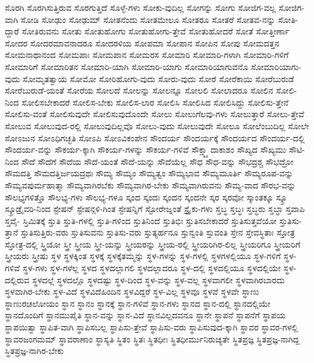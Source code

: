 {ಸೊರಗಿ
ಸೊರಗಿಸುತ್ತಿರುವ
ಸೊರಗುತ್ತಿದೆ
ಸೊಳ್ಳೆ-ಗಳು
ಸೋಕು-ವುದಿಲ್ಲ
ಸೋಗನ್ನು
ಸೋಗು
ಸೋಜಿಗ-ವಲ್ಲ
ಸೋಜಿಗ-ವಾಗಿ
ಸೋಡಿ
ಸೋಢುಂ
ಸೋಢುಮ್
ಸೋತನೆಂದು
ಸೋತಮೇಲೂ
ಸೋತರೂ
ಸೋತರೆ
ಸೋತವ-ನನ್ನು
ಸೋತಿ-ದ್ದಾರೆ
ಸೋತಿರುವನು
ಸೋತು
ಸೋತುಹೋಗು
ಸೋತುಹೋಗು-ತ್ತೇವೆ
ಸೋತುಹೋದರೆ
ಸೋತೆ
ಸೋತ್ತೀರ್ಣಾ
ಸೋದರ
ಸೋದರಮಾವನಾದರೂ
ಸೋದರಳಿಯ
ಸೋಪಮಾ
ಸೋಪಾನ
ಸೋಪಿನ
ಸೋಪು
ಸೋಮದತ್ತನ
ಸೋಮನಾಥಾನಂದ
ಸೋಮಪಾಃ
ಸೋಮಪಾನ
ಸೋಮರಸ
ಸೋಮಾರಿ
ಸೋಮಾರಿ-ಗಳಾಗಿ
ಸೋಮಾರಿ-ಗಳಿಗೆ
ಸೋಮಾರಿಗೆ
ಸೋಮಾರಿತನ
ಸೋಮಾರಿ-ಯಾಗಿ
ಸೋಮಾರಿ-ಯಾಗು
ಸೋಮಾರಿಯಾಗುವನೊ
ಸೋಮಾರಿಯಾಗು-ವುದು
ಸೋಮೃತತ್ವಾಯ
ಸೋಮೋ
ಸೋರಿಹೋಗು-ವುದು
ಸೋರು-ವುದು
ಸೋರೆ
ಸೋರೆಕಾಯಿ
ಸೋರೆಬುರುಡೆ
ಸೋರೆಬುರುಡೆ-ಯಂತೆ
ಸೋರೆಯ
ಸೋಲದೆ
ಸೋಲನ್ನು
ಸೋಲನ್ನೂ
ಸೋಲಲಿ
ಸೋಲಾದರೂ
ಸೋಲಿನ
ಸೋಲಿ-ನಿಂದ
ಸೋಲಿಸಬೇಕಾದರೆ
ಸೋಲಿಸ-ಬೇಕು
ಸೋಲಿಸ-ಲಾರ
ಸೋಲಿಸಿ
ಸೋಲಿಸಿದ
ಸೋಲಿಸಿದ್ದು
ಸೋಲಿಸು-ತ್ತೇನೆ
ಸೋಲಿಸು-ವಂತೆ
ಸೋಲಿಸುವುದೇ
ಸೋಲಿಸುವುದೊಂದೇ
ಸೋಲು
ಸೋಲುಗೆಲವು-ಗಳು
ಸೋಲುತ್ತಾರೆ
ಸೋಲು-ತ್ತೇವೆ
ಸೋಲುವ
ಸೋಲುವುದ-ರಲ್ಲಿ
ಸೋಲುವುದಿಲ್ಲವೊ
ಸೋಲು-ವುದು
ಸೋಲುವುದೇ
ಸೋಲೂ
ಸೋಲೆಂಬುದಿಲ್ಲ
ಸೋಲೇ
ಸೋಽಜುನ
ಸೋಽಧಿಗಚ್ಛತಿ
ಸೋಽಪಿ
ಸೋಽವಿಕಂಪೇನ
ಸೌಂದರ್ಯ
ಸೌಂದರ್ಯಕ್ಕೆ
ಸೌಂದರ್ಯದ
ಸೌಂದರ್ಯ-ದಲ್ಲಿ
ಸೌಂದರ್ಯ-ವನ್ನು
ಸೌಕರ್ಯ-ಕ್ಕಾಗಿ
ಸೌಕರ್ಯ-ಗಳನ್ನು
ಸೌಕರ್ಯ-ಗಳಿವೆ
ಸೌಕ್ಷ್ಮ್ಯಾದಾಕಾಶಂ
ಸೌಖ್ಯದ
ಸೌಖ್ಯಮು
ಸೌಟಿ-ನಿಂದ
ಸೌದೆ
ಸೌದೆಗೆ
ಸೌದೆಯ
ಸೌದೆ-ಯಂತೆ
ಸೌದೆ-ಯನ್ನು
ಸೌದೆಯೆಲ್ಲ
ಸೌಧ
ಸೌಧ-ವನ್ನು
ಸೌಭದ್ರಶ್ಚ
ಸೌಭದ್ರೋ
ಸೌಮದತ್ತಿ
ಸೌಮದತ್ತಿರ್ಜಯದ್ರಥಃ
ಸೌಮ್ಯ
ಸೌಮ್ಯಂ
ಸೌಮ್ಯತ್ವಂ
ಸೌಮ್ಯಭಾವ
ಸೌಮ್ಯಮೂರ್ತಿ
ಸೌಮ್ಯರೂಪ-ವನ್ನು
ಸೌಮ್ಯವಪುರ್ಮಹಾತ್ಮಾ
ಸೌಮ್ಯವಾಗಿರಬೆಕು
ಸೌಮ್ಯವಾಗಿರ-ಬೇಕು
ಸೌಮ್ಯವಾಗಿರುವನು
ಸೌಮ್ಯ-ವಾದ
ಸೌರಭ-ವನ್ನು
ಸೌಲಭ್ಯಗಳಿತ್ತೊ
ಸೌಲಭ್ಯ-ಗಳು
ಸೌಲಭ್ಯ-ಗಳೂ
ಸ್ಕಂದ
ಸ್ಕಂದಃ
ಸ್ಕಂದನ
ಸ್ಕಂದನೇ
ಸ್ಕರ
ಸ್ಕರವೋ
ಸ್ಕಾಂತಕ್ಕೂ
ಸ್ಕ್ರೂ
ಸ್ಕ್ರೂಡ್ರೈವರಿ-ನಿಂದ
ಸ್ಟೇಷನ್
ಸ್ಟೇಷನ್ಗಳಿ-ಗಿಂತ
ಸ್ಟೇಷನ್ನಿಗೆ
ಸ್ಟೋರೇಜ್ನಂತೆ
ಸ್ಟ್ರೈಕು-ಗಳು
ಸ್ತಬ್ಧ
ಸ್ತಬ್ಧಃ
ಸ್ತಬ್ಧರು
ಸ್ತಬ್ಧಾ
ಸ್ತವಾಪಿ
ಸ್ತವೈ-
ಸ್ತಿಮಿತಕ್ಕೆ
ಸ್ತುತಿ
ಸ್ತುತಿ-ಗಳಲ್ಲಿ
ಸ್ತುತಿ-ಗಳಿಂದ
ಸ್ತುತಿನಿಂದೆ
ಸ್ತುತಿಭಿಃ
ಸ್ತುತಿಸಬೇಕಾದರೆ
ಸ್ತುತಿಸುತ್ತವೆಯೋ
ಸ್ತುತಿಸು-ತ್ತಾನೆ
ಸ್ತುತಿಸುತ್ತಿರು-ವರು
ಸ್ತುತಿಸುವನು
ಸ್ತುತಿಸು-ವರು
ಸ್ತುತ್ಯರ್ಹನೂ
ಸ್ತುನ್ವಂತಿ
ಸ್ತುವಂತಿ
ಸ್ತೇನ
ಸ್ತೇವಸ್ಥಿತಾಃ
ಸ್ತೋತ್ರ
ಸ್ತೋತ್ರ-ದಲ್ಲಿ
ಸ್ತ್ರಿಯೋ
ಸ್ತ್ರೀ
ಸ್ತ್ರೀಯ
ಸ್ತ್ರೀ-ಯನ್ನು
ಸ್ತ್ರೀಯರನ್ನು
ಸ್ತ್ರೀಯ-ರಲ್ಲಿ
ಸ್ತ್ರೀಯರಿಗಿರ-ಲಿಲ್ಲ
ಸ್ತ್ರೀಯರಿಗೂ
ಸ್ತ್ರೀಯರಿಗೆ
ಸ್ತ್ರೀಯರು
ಸ್ತ್ರೀಷು
ಸ್ಥಳ
ಸ್ಥಳಕ್ಕಿಂತ
ಸ್ಥಳಕ್ಕೆ
ಸ್ಥಳಕ್ಕೆತಮ್ಮನ್ನು
ಸ್ಥಳ-ಗಳನ್ನು
ಸ್ಥಳ-ಗಳಲ್ಲಿ
ಸ್ಥಳಗಳಲ್ಲಿಯೂ
ಸ್ಥಳ-ಗಳಿಗೆ
ಸ್ಥಳ-ಗಳಿವೆ
ಸ್ಥಳ-ಗಳು
ಸ್ಥಳ-ಗಳೆಲ್ಲ
ಸ್ಥಳದ
ಸ್ಥಳದಲ್ಲಾಗಲಿ
ಸ್ಥಳದಲ್ಲಾದರೂ
ಸ್ಥಳ-ದಲ್ಲಿ
ಸ್ಥಳದಲ್ಲಿಯೂ
ಸ್ಥಳದಲ್ಲಿಯೇ
ಸ್ಥಳ-ದಲ್ಲಿರುವ
ಸ್ಥಳದಲ್ಲೆ
ಸ್ಥಳದಲ್ಲೊ
ಸ್ಥಳದಷ್ಟು
ಸ್ಥಳ-ದಿಂದ
ಸ್ಥಳ-ವನ್ನು
ಸ್ಥಳ-ವಲ್ಲ
ಸ್ಥಳವಾಗಲೀ
ಸ್ಥಳವಾಗಿರಬಾರದು
ಸ್ಥಳವಾಗಿರ-ಬೇಕು
ಸ್ಥಳ-ವಿದೆ
ಸ್ಥಳವಿದೆಹಿಂದಿನ
ಸ್ಥಳವಿದ್ದರೆ
ಸ್ಥಳ-ವಿಲ್ಲ
ಸ್ಥಳವೂ
ಸ್ಥಳವೆ
ಸ್ಥಳವೇ
ಸ್ಥಾಣು
ಸ್ಥಾಣುರಚಲೋಯಂ
ಸ್ಥಾನ
ಸ್ಥಾನಂ
ಸ್ಥಾನಕ್ಕೆ
ಸ್ಥಾನ-ಗಳಿವೆ
ಸ್ಥಾನ-ಗಳು
ಸ್ಥಾನದ
ಸ್ಥಾನ-ದಲ್ಲಿ
ಸ್ಥಾನದಲ್ಲಿಯೇ
ಸ್ಥಾನದೊಂದಿಗೆ
ಸ್ಥಾನಮುಪೈತಿ
ಸ್ಥಾನ-ವನ್ನು
ಸ್ಥಾನ-ವಿದೆ
ಸ್ಥಾನವಿಲ್ಲದವನೂ
ಸ್ಥಾನೇ
ಸ್ಥಾಪನೆ
ಸ್ಥಾಪನೆಗೆ
ಸ್ಥಾಪಯ
ಸ್ಥಾಪಯಿತ್ವಾ
ಸ್ಥಾಪಿತ-ವಾಗಿ
ಸ್ಥಾಪಿಸಬಲ್ಲ
ಸ್ಥಾಪಿಸು-ತ್ತೇವೆ
ಸ್ಥಾಪಿಸು-ವರು
ಸ್ಥಾಪಿಸುವುದ-ಕ್ಕಾಗಿ
ಸ್ಥಾವರ
ಸ್ಥಾವರ-ಗಳಲ್ಲಿ
ಸ್ಥಾವರಜಂಗಮಮ್
ಸ್ಥಾವರಾಣಾಂ
ಸ್ಥಾಸ್ಯತಿ
ಸ್ಥಿತಂ
ಸ್ಥಿತಃ
ಸ್ಥಿತಧೀಃ
ಸ್ಥಿತಧೀರ್ಮುನಿರುಚ್ಯತೇ
ಸ್ಥಿತಪ್ರಜ್ಞ
ಸ್ಥಿತಪ್ರಜ್ಞ-ನಾಗಿದ್ದ
ಸ್ಥಿತಪ್ರಜ್ಞ-ನಾಗಿರ-ಬೇಕು
}
